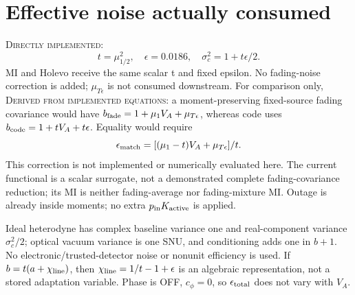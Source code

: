 \documentclass[11pt]{article}
\newcommand{\DI}{\textsc{Directly implemented}}
\newcommand{\DE}{\textsc{Derived from implemented equations}}
\begin{document}
\section{Effective noise actually consumed}
\DI:
\begin{equation}t=\mu_{1/2}^2,\quad\epsilon=0.0186,\quad\sigma_c^2=1+t\epsilon/2.\end{equation}
MI and Holevo receive the same scalar t and fixed epsilon.
No fading-noise correction is added; $\mu_{T\epsilon}$ is not consumed downstream.
For comparison only, \DE: a moment-preserving fixed-source fading covariance
would have $b_{\rm fade}=1+\mu_1V_A+\mu_{T\epsilon}$, whereas code uses
$b_{\rm code}=1+tV_A+t\epsilon$. Equality would require
\begin{equation}\epsilon_{\rm match}=[(\mu_1-t)V_A+\mu_{T\epsilon}]/t.\end{equation}
This correction is not implemented or numerically evaluated here.
The current functional is a scalar surrogate, not a demonstrated complete
fading-covariance reduction; its MI is neither fading-average nor fading-mixture
MI. Outage is already inside moments; no extra $p_{\rm in}K_{\rm active}$ is applied.

Ideal heterodyne has complex baseline variance one and real-component variance
$\sigma_c^2/2$; optical vacuum variance is one SNU, and conditioning adds one
in $b+1$. No electronic/trusted-detector noise or nonunit efficiency is used.
If $b=t(a+\chi_{\rm line})$, then $\chi_{\rm line}=1/t-1+\epsilon$ is
an algebraic representation, not a stored adaptation variable.
Phase is OFF, $c_\phi=0$, so $\epsilon_{\rm total}$ does not vary with $V_A$.
\end{document}
